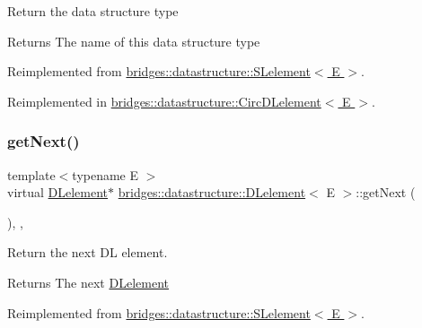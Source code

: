 Return the data structure type

\begin{DoxyReturn}{Returns}
The name of this data structure type 
\end{DoxyReturn}


Reimplemented from \hyperlink{classbridges_1_1datastructure_1_1_s_lelement_a602156aacacd73d1faa365d68d8af31b}{bridges\+::datastructure\+::\+S\+Lelement$<$ E $>$}.



Reimplemented in \hyperlink{classbridges_1_1datastructure_1_1_circ_d_lelement_aec7f9b9dc6626c1a872feb91cd65425d}{bridges\+::datastructure\+::\+Circ\+D\+Lelement$<$ E $>$}.

\mbox{\label{classbridges_1_1datastructure_1_1_d_lelement_a63212051ea77d74bd751dea00288d2be}} 
\subsubsection{\texorpdfstring{get\+Next()}{getNext()}\hspace{0.1cm}{\footnotesize\ttfamily [1/2]}}
{\footnotesize\ttfamily template$<$typename E $>$ \\
virtual \hyperlink{classbridges_1_1datastructure_1_1_d_lelement}{D\+Lelement}$\ast$ \hyperlink{classbridges_1_1datastructure_1_1_d_lelement}{bridges\+::datastructure\+::\+D\+Lelement}$<$ E $>$\+::get\+Next (\begin{DoxyParamCaption}{ }\end{DoxyParamCaption})\hspace{0.3cm}{\ttfamily [inline]}, {\ttfamily [override]}, {\ttfamily [virtual]}}

Return the next DL element.

\begin{DoxyReturn}{Returns}
The next \hyperlink{classbridges_1_1datastructure_1_1_d_lelement}{D\+Lelement} 
\end{DoxyReturn}


Reimplemented from \hyperlink{classbridges_1_1datastructure_1_1_s_lelement_ae43dd771d9ced7cb17f1d35f34cd9a42}{bridges\+::datastructure\+::\+S\+Lelement$<$ E $>$}.



